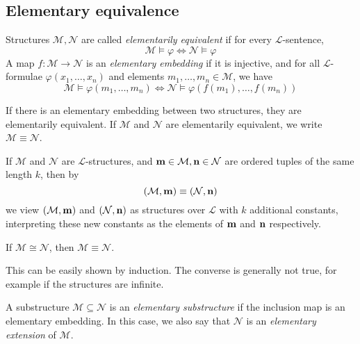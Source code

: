 \subsection{Elementary equivalence}
\begin{definition}
    Structures \( \mathcal M, \mathcal N \) are called \emph{elementarily equivalent} if for every \( \mathcal L \)-sentence,
    \[ \mathcal M \vDash \varphi \iff \mathcal N \vDash \varphi \]
    A map \( f : \mathcal M \to \mathcal N \) is an \emph{elementary embedding} if it is injective, and for all \( \mathcal L \)-formulae \( \varphi(x_1, \dots, x_n) \) and elements \( m_1, \dots, m_n \in \mathcal M \), we have
    \[ \mathcal M \vDash \varphi(m_1, \dots, m_n) \iff \mathcal N \vDash \varphi(f(m_1), \dots, f(m_n)) \]
\end{definition}
If there is an elementary embedding between two structures, they are elementarily equivalent.
If \( \mathcal M \) and \( \mathcal N \) are elementarily equivalent, we write \( \mathcal M \equiv \mathcal N \).
\begin{remark}
    If \( \mathcal M \) and \( \mathcal N \) are \( \mathcal L \)-structures, and \( \vb m \in \mathcal M, \vb n \in \mathcal N \) are ordered tuples of the same length \( k \), then by
    \[ (\mathcal M, \vb m) \equiv (\mathcal N, \vb n) \]
    we view \( (\mathcal M, \vb m) \) and \( (\mathcal N, \vb n) \) as structures over \( \mathcal L \) with \( k \) additional constants, interpreting these new constants as the elements of \( \vb m \) and \( \vb n \) respectively.
\end{remark}
\begin{proposition}
    If \( \mathcal M \cong \mathcal N \), then \( \mathcal M \equiv \mathcal N \).
\end{proposition}
This can be easily shown by induction.
The converse is generally not true, for example if the structures are infinite.
\begin{definition}
    A substructure \( \mathcal M \subseteq \mathcal N \) is an \emph{elementary substructure} if the inclusion map is an elementary embedding.
    In this case, we also say that \( \mathcal N \) is an \emph{elementary extension} of \( \mathcal M \).
\end{definition}

